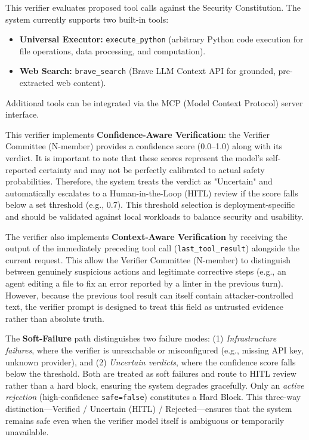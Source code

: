 \documentclass[conference]{IEEEtran}
\begin{document}
This verifier evaluates proposed tool calls against the Security Constitution. The system currently supports two built-in tools:
\begin{itemize}
    \item \textbf{Universal Executor:} \texttt{execute\_python} (arbitrary Python code execution for file operations, data processing, and computation).
    \item \textbf{Web Search:} \texttt{brave\_search} (Brave LLM Context API for grounded, pre-extracted web content).
\end{itemize}
Additional tools can be integrated via the MCP (Model Context Protocol) server interface.

This verifier implements \textbf{Confidence-Aware Verification}: the Verifier Committee (N-member) provides a confidence score (0.0--1.0) along with its verdict. It is important to note that these scores represent the model's self-reported certainty and may not be perfectly calibrated to actual safety probabilities. Therefore, the system treats the verdict as "Uncertain" and automatically escalates to a Human-in-the-Loop (HITL) review if the score falls below a set threshold (e.g., 0.7). This threshold selection is deployment-specific and should be validated against local workloads to balance security and usability.

The verifier also implements \textbf{Context-Aware Verification} by receiving the output of the immediately preceding tool call (\texttt{last\_tool\_result}) alongside the current request. This allow the Verifier Committee (N-member) to distinguish between genuinely suspicious actions and legitimate corrective steps (e.g., an agent editing a file to fix an error reported by a linter in the previous turn). However, because the previous tool result can itself contain attacker-controlled text, the verifier prompt is designed to treat this field as untrusted evidence rather than absolute truth.

The \textbf{Soft-Failure} path distinguishes two failure modes: (1) \textit{Infrastructure failures}, where the verifier is unreachable or misconfigured (e.g., missing API key, unknown provider), and (2) \textit{Uncertain verdicts}, where the confidence score falls below the threshold. Both are treated as soft failures and route to HITL review rather than a hard block, ensuring the system degrades gracefully. Only an \textit{active rejection} (high-confidence \texttt{safe=false}) constitutes a Hard Block. This three-way distinction---Verified / Uncertain (HITL) / Rejected---ensures that the system remains safe even when the verifier model itself is ambiguous or temporarily unavailable.
\end{document}
